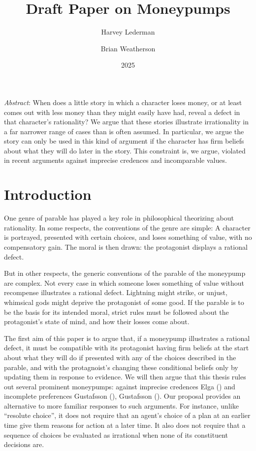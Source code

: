 \documentclass[
  11pt,
  letterpaper,
  DIV=11,
  numbers=noendperiod,
  twoside]{scrartcl}
\title{Draft Paper on Moneypumps}
\author{Harvey Lederman \and Brian Weatherson}
\date{2025}
\renewenvironment{abstract}
 {\vspace{-1.25cm}
 \quotation\small\noindent\emph{Abstract}:}
 {\endquotation}
\begin{document}
\maketitle
\begin{abstract}
When does a little story in which a character loses money, or at least
comes out with less money than they might easily have had, reveal a
defect in that character's rationality? We argue that these stories
illustrate irrationality in a far narrower range of cases than is often
assumed. In particular, we argue the story can only be used in this kind
of argument if the character has firm beliefs about what they will do
later in the story. This constraint is, we argue, violated in recent
arguments against imprecise credences and incomparable values.
\end{abstract}


\section{Introduction}\label{introduction}

One genre of parable has played a key role in philosophical theorizing
about rationality. In some respects, the conventions of the genre are
simple: A character is portrayed, presented with certain choices, and
loses something of value, with no compensatory gain. The moral is then
drawn: the protagonist displays a rational defect.

But in other respects, the generic conventions of the parable of the
moneypump are complex. Not every case in which someone loses something
of value without recompense illustrates a rational defect. Lightning
might strike, or unjust, whimsical gods might deprive the protagonist of
some good. If the parable is to be the basis for its intended moral,
strict rules must be followed about the protagonist's state of mind, and
how their losses come about.

The first aim of this paper is to argue that, if a moneypump illustrates
a rational defect, it must be compatible with its protagonist having
firm beliefs at the start about what they will do if presented with any
of the choices described in the parable, and with the protagnoist's
changing these conditional beliefs only by updating them in response to
evidence. We will then argue that this thesis rules out several
prominent moneypumps: against imprecise credences Elga
() and incomplete preferences Gustafsson
(), Gustafsson
(). Our proposal provides an
alternative to more familiar responses to such arguments. For instance,
unlike ``resolute choice'', it does not require that an agent's choice
of a plan at an earlier time give them reasons for action at a later
time. It also does not require that a sequence of choices be evaluated
as irrational when none of its constituent decisions are.
\end{document}

